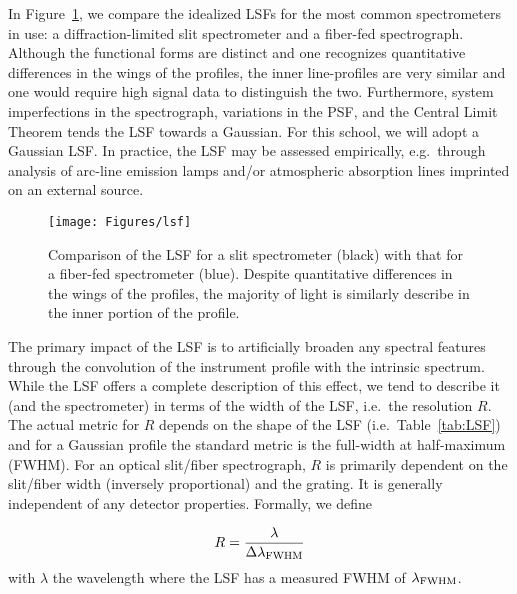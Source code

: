 \documentclass[graybox]{svmult}
\begin{document}
In Figure~\ref{fig:LSF}, we compare the idealized LSFs for the
most common spectrometers in use: a diffraction-limited slit 
spectrometer and a fiber-fed spectrograph.
Although the functional forms are distinct and one recognizes
quantitative differences in the wings of the profiles,
the inner line-profiles are very similar and one would
require high signal data to distinguish the two.
Furthermore, system imperfections in the spectrograph, variations
in the PSF, and the Central Limit Theorem tends the LSF 
towards a Gaussian. For this school, we will adopt a Gaussian LSF.
In practice, the LSF may be assessed empirically, e.g.\ through
analysis of arc-line emission lamps and/or 
atmospheric absorption lines imprinted on an external source.


%
\begin{figure}[b]
\sidecaption
\texttt{[image: Figures/lsf]}
%
%
\caption{Comparison of the LSF for a slit spectrometer (black) with
that for a fiber-fed spectrometer (blue).  Despite quantitative 
differences in the wings of the profiles, the majority of light is
similarly describe in the inner portion of the profile.
}
\label{fig:LSF}       %
\end{figure}


The primary impact of the LSF is to artificially broaden
any spectral features through the convolution of the instrument
profile with the intrinsic spectrum.  While the LSF offers a
complete description of this effect, we tend to describe it
(and the spectrometer) in terms of the width of the LSF, 
i.e.\ the resolution $R$.
The actual metric for $R$ depends on the shape of the 
LSF (i.e.\ Table~\ref{tab:LSF}) and for a Gaussian profile
the standard metric is the full-width at half-maximum (FWHM).
For an optical slit/fiber spectrograph, $R$ is primarily 
dependent on the slit/fiber width (inversely proportional)
and the grating.  It is generally independent of any detector
properties.  Formally, we define

\begin{equation}
R = \frac{\lambda}{\Delta\lambda_{\rm FWHM}}
\label{eqn:R}
\end{equation}
with $\lambda$ the wavelength where the LSF has a measured
FWHM of $\lambda_{\rm FWHM}$.
\end{document}
